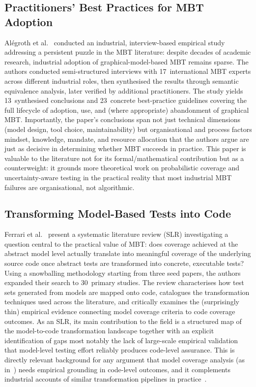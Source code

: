 \subsection{Practitioners' Best Practices for MBT Adoption}
\label{sec:lr_alegroth}

Al\'{e}groth et al.~\cite{alegroth2022practitioners} conducted an
industrial, interview-based empirical study addressing a persistent
puzzle in the MBT literature: despite decades of academic research,
industrial adoption of graphical-model-based MBT remains sparse.  The
authors conducted semi-structured interviews with 17~international MBT
experts across different industrial roles, then synthesised the results
through semantic equivalence analysis, later verified by additional
practitioners.  The study yields 13~synthesised conclusions and
23~concrete best-practice guidelines covering the full lifecycle of
adoption, use, and (where appropriate) abandonment of graphical MBT.
Importantly, the paper's conclusions span not just technical dimensions
(model design, tool choice, maintainability) but organisational and
process factors mindset, knowledge, mandate, and resource
allocation that the authors argue are just as decisive in determining
whether MBT succeeds in practice.  This paper is valuable to the
literature not for its formal/mathematical contribution but as a
counterweight: it grounds more theoretical work on probabilistic
coverage and uncertainty-aware testing in the practical reality that most
industrial MBT failures are organisational, not algorithmic.

\subsection{Transforming Model-Based Tests into Code}
\label{sec:lr_ferrari}

Ferrari et al.~\cite{ferrari2023transforming} present a systematic
literature review (SLR) investigating a question central to the
practical value of MBT: does coverage achieved at the abstract model
level actually translate into meaningful coverage of the underlying
source code once abstract tests are transformed into concrete, executable
tests?  Using a snowballing methodology starting from three seed papers,
the authors expanded their search to 30~primary studies.  The review
characterises how test sets generated from models are mapped onto code,
catalogues the transformation techniques used across the literature, and
critically examines the (surprisingly thin) empirical evidence connecting
model coverage criteria to code coverage outcomes.  As an SLR, its main
contribution to the field is a structured map of the model-to-code
transformation landscape together with an explicit identification of
gaps most notably the lack of large-scale empirical validation that
model-level testing effort reliably produces code-level assurance.  This
is directly relevant background for any argument that model coverage
analysis (as in~\cite{prasetya2021coverage}) needs empirical grounding in
code-level outcomes, and it complements industrial accounts of similar
transformation pipelines in practice~\cite{garousi2021mbt_practice}.

